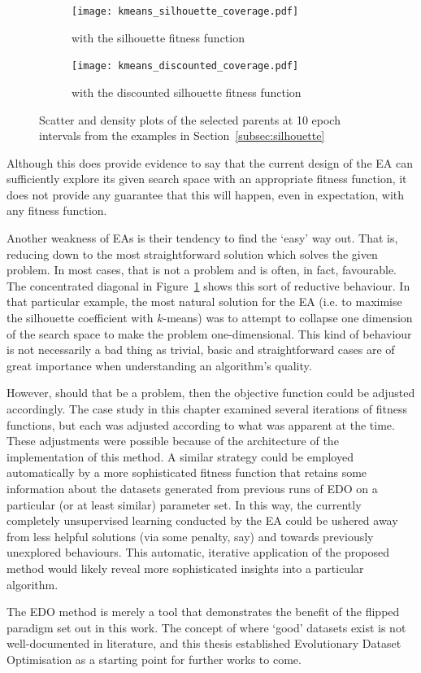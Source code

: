 \begin{figure}[htbp]
    \centering
    \begin{subfigure}{\imgwidth}
        \texttt{[image: kmeans\_silhouette\_coverage.pdf]}
        \caption{%
            with the silhouette fitness function%
        }\label{fig:silhouette_coverage}
    \end{subfigure}

    \vspace{1em}
    \begin{subfigure}{\imgwidth}
        \texttt{[image: kmeans\_discounted\_coverage.pdf]}
        \caption{with the discounted silhouette fitness function}
    \end{subfigure}
    \caption{%
        Scatter and density plots of the selected parents at 10 epoch
        intervals from the examples in Section~\ref{subsec:silhouette}
    }\label{fig:coverage}
\end{figure}

Although this does provide evidence to say that the current design of the EA can
sufficiently explore its given search space with an appropriate fitness
function, it does not provide any guarantee that this will happen, even in
expectation, with any fitness function.

Another weakness of EAs is their tendency to find the `easy' way out. That is,
reducing down to the most straightforward solution which solves the given
problem. In most cases, that is not a problem and is often, in fact, favourable.
The concentrated diagonal in Figure~\ref{fig:silhouette_coverage} shows this
sort of reductive behaviour. In that particular example, the most natural
solution for the EA (i.e. to maximise the silhouette coefficient with
\(k\)-means) was to attempt to collapse one dimension of the search space to
make the problem one-dimensional. This kind of behaviour is not necessarily a
bad thing as trivial, basic and straightforward cases are of great importance
when understanding an algorithm's quality.

However, should that be a problem, then the objective function could be adjusted
accordingly. The case study in this chapter examined several iterations of
fitness functions, but each was adjusted according to what was apparent at the
time. These adjustments were possible because of the architecture of the
implementation of this method. A similar strategy could be employed
automatically by a more sophisticated fitness function that retains some
information about the datasets generated from previous runs of EDO on a
particular (or at least similar) parameter set. In this way, the currently
completely unsupervised learning conducted by the EA could be ushered away from
less helpful solutions (via some penalty, say) and towards previously unexplored
behaviours. This automatic, iterative application of the proposed method would
likely reveal more sophisticated insights into a particular algorithm.

The EDO method is merely a tool that demonstrates the benefit of the flipped
paradigm set out in this work. The concept of where `good' datasets exist is not
well-documented in literature, and this thesis established Evolutionary
Dataset Optimisation as a starting point for further works to come.
